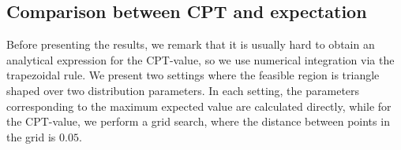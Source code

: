 \subsection{Comparison between CPT and expectation}
Before presenting the results, we remark that it is usually hard to obtain an analytical expression for the CPT-value, so we use numerical integration via the trapezoidal rule. 
We present two settings where the feasible region is triangle shaped over two distribution parameters. In each setting, the parameters corresponding to the maximum expected value are calculated directly, while for the CPT-value, we perform a grid search, where the distance between points in the grid is $0.05$. 
